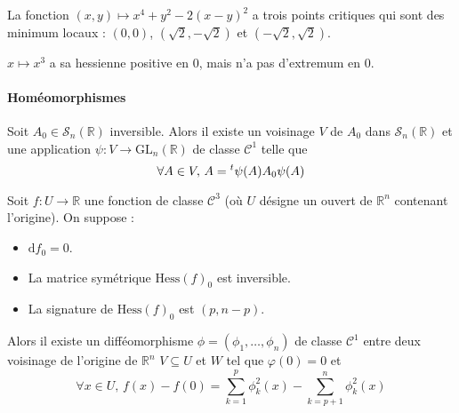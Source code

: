 	\begin{example}
		La fonction $(x,y) \mapsto x^4 + y^2 - 2(x-y)^2$ a trois points critiques qui sont des minimum locaux : $(0,0)$, $(\sqrt{2},-\sqrt{2})$ et $(-\sqrt{2},\sqrt{2})$.
	\end{example}
	
	\begin{cexample}
		$x \mapsto x^3$ a sa hessienne positive en $0$, mais n'a pas d'extremum en $0$.
	\end{cexample}
	
	\paragraph{Homéomorphismes}
	
	
	\begin{lemma}
		Soit $A_0 \in \mathcal{S}_n(\mathbb{R})$ inversible. Alors il existe un voisinage $V$ de $A_0$ dans $\mathcal{S}_n(\mathbb{R})$ et une application $\psi : V \rightarrow \mathrm{GL}_n(\mathbb{R})$ de classe $\mathcal{C}^1$ telle que
		\[ \forall A \in V, \, A = \mathstrut ^t \psi(A) A_0 \psi(A) \]
	\end{lemma}
	
	
	\begin{lemma}[Morse]
		Soit $f : U \rightarrow \mathbb{R}$ une fonction de classe $\mathcal{C}^3$ (où $U$ désigne un ouvert de $\mathbb{R}^n$ contenant l'origine). On suppose :
		\begin{itemize}
			\item $\mathrm{d} f_0 = 0$.
			\item La matrice symétrique $\mathrm{Hess} (f)_0$ est inversible.
			\item La signature de $\mathrm{Hess}(f)_0$ est $(p, n-p)$.
		\end{itemize}
		Alors il existe un difféomorphisme $\phi = (\phi_1, \dots, \phi_n)$ de classe $\mathcal{C}^1$ entre deux voisinage de l'origine de $\mathbb{R}^n$ $V \subseteq U$ et $W$ tel que $\varphi(0) = 0$ et
		\[ \forall x \in U, \, f(x) - f(0) = \sum_{k=1}^p \phi_k^2(x) - \sum_{k=p+1}^n \phi_k^2(x) \]
	\end{lemma}
	
	
